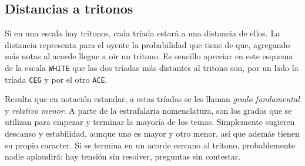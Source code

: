 \documentclass[]{report}
\begin{document}
\subsection{Distancias a tritonos}

Si en una escala hay tritonos, cada tríada estará a una distancia de ellos. La distancia representa para el oyente la probabilidad que tiene de que, agregando más notas al acorde llegue a oir un tritono. Es sencillo apreciar en este esquema de la escala \texttt{WHITE} que las dos tríadas más distantes al tritono son, por un lado la tríada \texttt{CEG} y por el otro \texttt{ACE}.

Resulta que en notación estandar, a estas tríadas se les llaman \emph{grado fundamental} y \emph{relativo menor}. A parte de la estrafalaria nomenclatura, son los grados que se utilizan para empezar y terminar la mayoría de los temas. Simplemente sugieren descanso y estabilidad, aunque uno es mayor y otro menor, así que además tienen su propio caracter. Si se termina en un acorde cercano al tritono, probablemente nadie aplaudirá: hay tensión sin resolver, preguntas sin contestar.
\end{document}
